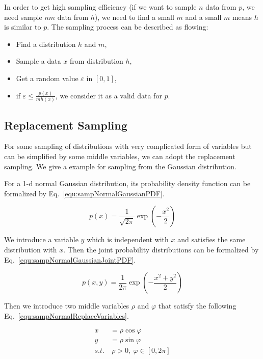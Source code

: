 \documentclass[runningheads,openany]{xhlPaper}
\begin{document}
In order to get high sampling efficiency (if we want to sample $n$ data from $p$, we need sample $nm$ data from $h$), we need to find a small $m$ and a small $m$ means $h$ is similar to $p$. The sampling process can be described as flowing:

\begin{itemize}
  \item Find a distribution $h$ and $m$,
  \item Sample a data $x$ from distribution $h$,
  \item Get a random value $\varepsilon$ in $\left[0, 1\right]$,
  \item if $\varepsilon \le {\frac{{p\left( {x} \right)}}{{mh\left( x \right)}}} $, we consider it as a valid data for $p$.
\end{itemize}

\subsection{Replacement Sampling}
For some sampling of distributions with very complicated form of variables but can be simplified by some middle variables, we can adopt the replacement sampling. We give a example for sampling from the Gaussian distribution.

For a 1-d normal Gaussian distribution, its probability density function can be formalized by Eq.~\ref{equ:sampNormalGaussianPDF}.

\begin{equation}
\label{equ:sampNormalGaussianPDF}
p\left( x \right) = \frac{1}{{\sqrt {2\pi } }}\exp \left( { - \frac{{{x^2}}}{2}} \right)
\end{equation}

We introduce a variable $y$ which is independent with $x$ and satisfies the same distribution with $x$. Then the joint probability distributions can be formalized by Eq.~\ref{equ:sampNormalGaussianJointPDF}.

\begin{equation}
\label{equ:sampNormalGaussianJointPDF}
p\left( {x,y} \right) = \frac{1}{{2\pi }}\exp \left( { - \frac{{{x^2} + {y^2}}}{2}} \right)
\end{equation}

Then we introduce two middle variables $\rho$ and $\varphi$ that satisfy the following Eq.~\ref{equ:sampNormalReplaceVariables}.

\begin{equation}
\label{equ:sampNormalReplaceVariables}
\begin{aligned}
x &= \rho \cos \varphi \\
y &= \rho \sin \varphi \\
s.t.&\ \rho  > 0,\ \varphi  \in \left[ {0,2\pi } \right]
\end{aligned}
\end{equation}
\end{document}

